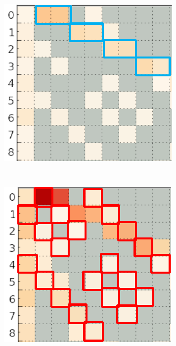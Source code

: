 \begin{figure}
\begin{minipage}[b]{0.33\linewidth}
    \end{minipage}%
    \begin{minipage}[b]{0.33\linewidth}
        \centering
        \includegraphics[width=0.9\linewidth]{chapter_4_figures/partial_heatmap_out_of_order_gather}
    \end{minipage}
    \\
    \begin{minipage}[b]{0.33\linewidth}
        \centering
        \includegraphics[width=0.9\linewidth]{chapter_4_figures/partial_heatmap_total_n2n}

\end{minipage}
\end{figure}
